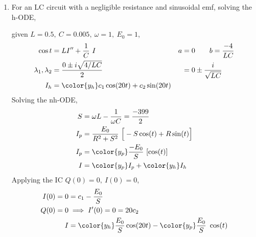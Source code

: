 \begin{enumerate}
    \item For an LC circuit with a negligible resistance and sinusoidal emf, solving
          the h-ODE, \par
          given $ L = 0.5,\ C = 0.005,\ \omega = 1,\ E_{0} = 1$,
          \begin{align}
              \cos t                   & = LI'' + \frac{1}{C}\ I        &
              a                        & = 0 \qquad b = \frac{-4}{LC}     \\
              \lambda_{1}, \lambda_{2} & = \frac{0 \pm i\sqrt{4/LC}}{2} &
                                       & = 0 \pm \frac{i}{\sqrt{LC}}      \\
              I_{h}                    & = {\color{y_h} c_{1}\cos(20 t)
              + c_{2}\sin(20 t)}
          \end{align}
          Solving the nh-ODE,
          \begin{align}
              S     & = \omega L - \frac{1}{\omega C} = \frac{-399}{2}              \\
              I_{p} & = \frac{E_{0}}{R^{2} + S^{2}}\ \Big[-S\cos(t) + R\sin(t)\Big] \\
              I_{p} & = {\color{y_p} \frac{-E_{0}}{S}\ [\cos(t)]}                   \\
              I     & ={\color{y_p} I_{p}} + {\color{y_h}I_{h}}
          \end{align}
          Applying the IC $ Q(0) = 0,\ I(0) = 0 $,
          \begin{align}
              I(0) = 0 & = c_{1} - \frac{E_{0}}{S}                 \\
              Q(0) = 0 & \implies I'(0) = 0 = 20c_{2}              \\
              I        & = {\color{y_h} \frac{E_{0}}{S} \cos(20t)}
              - {\color{y_p} \frac{E_{0}}{S}\ \cos(t)}
          \end{align}
          \begin{figure}[H]
              \centering
          \end{figure}


\end{enumerate}
